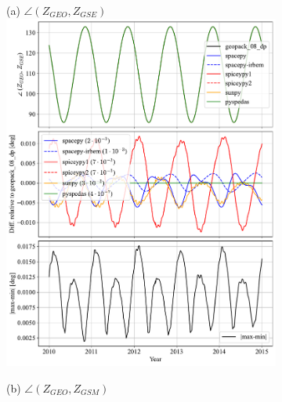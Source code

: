 \documentclass[draft]{agujournal2019}
\begin{document}
\begin{figure}[htb]
     \begin{subfigure}[b]{0.49\textwidth}
         (a) $\angle (Z_{GEO}, Z_{GSE})$
         \centering
         \includegraphics[width=\textwidth]{code/figures/angles/delta=1days_20100101-20150101/GEO_GSE.pdf}
     \end{subfigure}
     \begin{subfigure}[b]{0.49\textwidth}
         (b) $\angle (Z_{GEO}, Z_{GSM})$
         \centering

\end{subfigure}
\end{figure}
\end{document}
